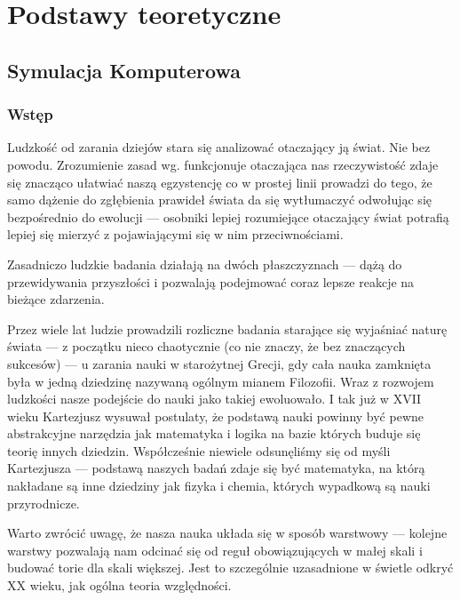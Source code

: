 \chapter{Podstawy teoretyczne}
\section[Symulacja komputerowa][Symulacja komputerowa]{Symulacja Komputerowa}

\subsection{Wstęp}
\par{
Ludzkość od zarania dziejów stara się analizować otaczający ją świat. Nie bez powodu. Zrozumienie zasad wg. funkcjonuje otaczająca nas rzeczywistość zdaje się znacząco ułatwiać naszą egzystencję co w prostej linii prowadzi do tego, że samo dążenie do zgłębienia prawideł świata da się wytłumaczyć odwołując się bezpośrednio do ewolucji --- osobniki lepiej rozumiejące otaczający świat potrafią lepiej się mierzyć z pojawiającymi się w nim przeciwnościami.
}

\par{
Zasadniczo ludzkie badania działają na dwóch płaszczyznach --- dążą do przewidywania przyszłości i pozwalają podejmować coraz lepsze reakcje na bieżące zdarzenia.
}

\par{
Przez wiele lat ludzie prowadzili rozliczne badania starające się wyjaśniać naturę świata --- z początku nieco chaotycznie (co nie znaczy, że bez znaczących sukcesów) --- u zarania nauki w starożytnej Grecji, gdy cała nauka zamknięta była w jedną dziedzinę nazywaną ogólnym mianem Filozofii.
Wraz z rozwojem ludzkości nasze podejście do nauki jako takiej ewoluowało. I tak już w XVII wieku Kartezjusz wysuwał postulaty, że podstawą nauki powinny być pewne abstrakcyjne narzędzia jak matematyka i logika na bazie których buduje się teorię innych dziedzin. Współcześnie niewiele odsunęliśmy się od myśli Kartezjusza --- podstawą naszych badań zdaje się być matematyka, na którą nakładane są inne dziedziny jak fizyka i chemia, których wypadkową są nauki przyrodnicze.
}

\par{
Warto zwrócić uwagę, że nasza nauka układa się w sposób warstwowy --- kolejne warstwy pozwalają nam odcinać się od reguł obowiązujących w małej skali i budować torie dla skali większej. Jest to szczególnie uzasadnione w świetle odkryć XX wieku, jak ogólna teoria względności.
}

